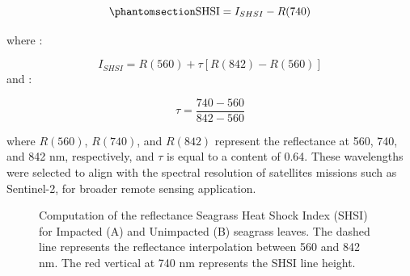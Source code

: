 \documentclass[
  letterpaper,
  11pt,
  english,
  singlespacing,
  headsepline]{MastersDoctoralThesis}
\begin{document}
\begin{spacing}{1.5}
\begin{equation}\phantomsection\label{eq-SDI}{
\text{SHSI} = I_{SHSI} - R(740)
}\end{equation}

where :

\[
I_{SHSI} = R(560) + \tau    [R(842) - R(560)]
\] and :

\[
\tau = \frac{740 - 560}{842 - 560}
\]

where \(R(560)\), \(R(740)\), and \(R(842)\) represent the reflectance
at 560, 740, and 842 nm, respectively, and \(\tau\) is equal to a
content of 0.64. These wavelengths were selected to align with the
spectral resolution of satellites missions such as Sentinel-2, for
broader remote sensing application.

\begin{figure}


\caption{\label{fig-SHSI_h}Computation of the reflectance Seagrass Heat
Shock Index (SHSI) for Impacted (A) and Unimpacted (B) seagrass leaves.
The dashed line represents the reflectance interpolation between 560 and
842 nm. The red vertical at 740 nm represents the SHSI line height.}


\end{figure}
\end{spacing}
\end{document}
